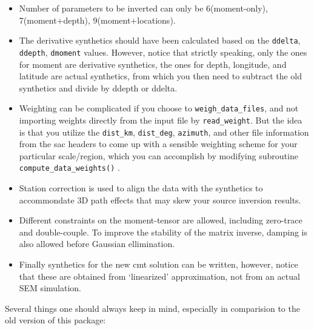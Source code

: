 \documentclass[12pt,titlepage,fleqn]{article}
\begin{document}
\begin{itemize}
 \item Number of parameters to be inverted can only be 6(moment-only), 7(moment+depth), 9(moment+locations). 
 \item The derivative synthetics should have been calculated based on the \verb=ddelta=, \verb=ddepth=, \verb=dmoment= values. However, notice that strictly speaking, only the ones for moment are derivative synthetics, the ones for depth, longitude, and latitude are actual synthetics, from which you then need to subtract the old synthetics and divide by ddepth or ddelta. 
 \item Weighting can be complicated if you choose to \verb=weigh_data_files=, and not importing weights directly from the input file by \verb=read_weight=. But the idea is that you utilize the \verb=dist_km=, \verb=dist_deg=, \verb=azimuth=, and other file information from the sac headers to come up with a sensible weighting scheme for your particular scale/region, which you can accomplish by modifying subroutine \verb=compute_data_weights()= . 
 \item Station correction is used to align the data with the synthetics to accommondate 3D path effects that may skew your source inversion results.
 \item Different constraints on the moment-tensor are allowed, including zero-trace and double-couple. To improve the stability of the matrix inverse, damping is also allowed before Gaussian ellimination.
 \item Finally synthetics for the new cmt solution can be written, however, notice that these are obtained from `linearized' approximation, not from an actual SEM simulation.
 \end{itemize}
Several things one should always keep in mind, especially in comparision to the old version of this package:
\end{document}
